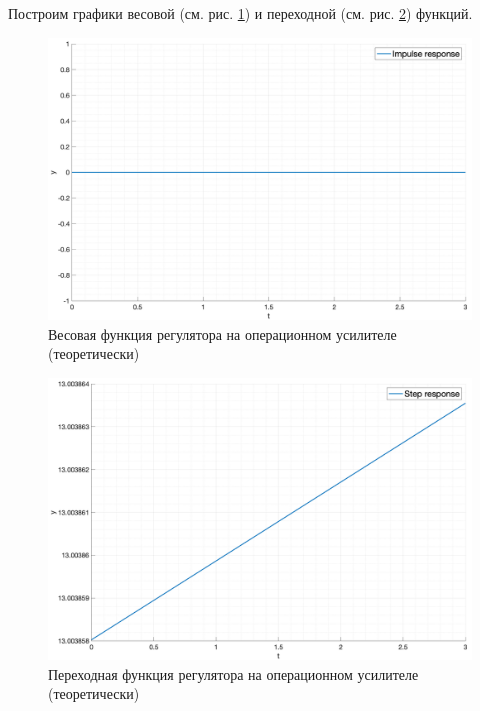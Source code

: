 Построим графики весовой (см. рис. \ref{fig:task5_impulse_response_eq}) и переходной (см. рис. \ref{fig:task5_step_response_eq}) функций.
\begin{figure}[ht!]
    \centering
    \includegraphics[width=\textwidth]{media/plots/task5_impulse_response_eq.png}
    \caption{Весовая функция регулятора на операционном усилителе (теоретически)}
    \label{fig:task5_impulse_response_eq}
\end{figure}
\begin{figure}[ht!]
    \centering
    \includegraphics[width=\textwidth]{media/plots/task5_step_response_eq.png}
    \caption{Переходная функция регулятора на операционном усилителе (теоретически)}
    \label{fig:task5_step_response_eq}
\end{figure}


